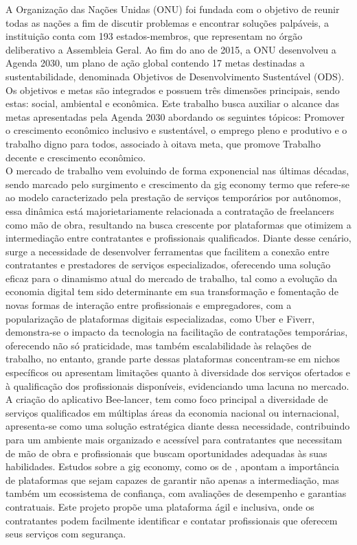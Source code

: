 
A Organização das Nações Unidas (ONU) foi fundada com o objetivo de reunir todas as nações a fim de discutir problemas e encontrar soluções palpáveis, a instituição conta com 193 estados-membros, que representam no órgão deliberativo a Assembleia Geral. Ao fim do ano de 2015, a ONU desenvolveu a Agenda 2030, um plano de ação global contendo 17 metas destinadas a sustentabilidade, denominada Objetivos de Desenvolvimento Sustentável (ODS). Os objetivos e metas são integrados e possuem três dimensões principais, sendo estas: social, ambiental e econômica. Este trabalho busca auxiliar o alcance das metas apresentadas pela Agenda 2030 abordando os seguintes tópicos: Promover o crescimento econômico inclusivo e sustentável, o emprego pleno e produtivo e o trabalho digno para todos, associado à oitava meta, que promove Trabalho decente e crescimento econômico.\\

O mercado de trabalho vem evoluindo de forma exponencial nas últimas décadas, sendo marcado pelo surgimento e crescimento da gig economy termo que refere-se ao modelo caracterizado pela prestação de serviços temporários por autônomos, essa dinâmica está majorietariamente relacionada a contratação de freelancers como mão de obra, resultando na busca crescente por plataformas que otimizem a intermediação entre contratantes e profissionais qualificados. Diante desse cenário, surge a necessidade de desenvolver ferramentas que facilitem a conexão entre contratantes e prestadores de serviços especializados, oferecendo uma solução eficaz para o dinamismo atual do mercado de trabalho, tal como a evolução da economia digital tem sido determinante em sua transformação e fomentação de novas formas de interação entre profissionais e empregadores, com a popularização de plataformas digitais especializadas, como Uber e Fiverr, demonstra-se o impacto da tecnologia na facilitação de contratações temporárias, oferecendo não só praticidade, mas também escalabilidade às relações de trabalho, no entanto, grande parte dessas plataformas concentram-se em nichos específicos ou apresentam limitações quanto à diversidade dos serviços ofertados e à qualificação dos profissionais disponíveis, evidenciando uma lacuna no mercado.\\

A criação do aplicativo Bee-lancer, tem como foco principal a diversidade de serviços qualificados em múltiplas áreas da economia nacional ou internacional, apresenta-se como uma solução estratégica diante dessa necessidade, contribuindo para um ambiente mais organizado e acessível para contratantes que necessitam de mão de obra e profissionais que buscam oportunidades adequadas às suas habilidades. Estudos sobre a gig economy, como os de \cite{Kassie2018}, apontam a importância de plataformas que sejam capazes de garantir não apenas a intermediação, mas também um ecossistema de confiança, com avaliações de desempenho e garantias contratuais. Este projeto propõe uma plataforma ágil e inclusiva, onde os contratantes podem facilmente identificar e contatar profissionais que oferecem seus serviços com segurança.\\

